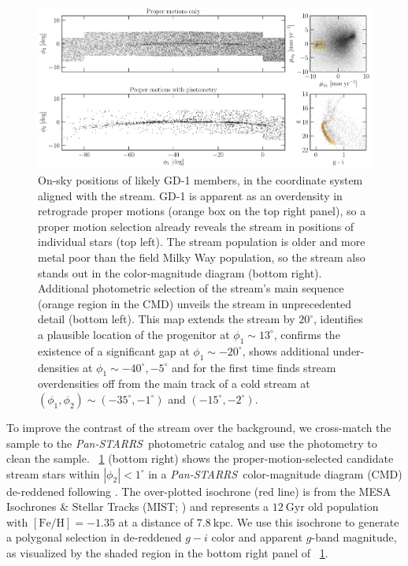 \documentclass[modern]{aastex62}
\newcommand{\pans}{\textsl{Pan-STARRS}}
\newcommand{\kpc}{\textrm{kpc}}
\newcommand{\feh}{\ensuremath{[\textrm{Fe} / \textrm{H}]}}
\begin{document}
\begin{figure}
\begin{center}
\includegraphics[width=\textwidth]{gd1_sample.pdf}
\end{center}
\caption{
On-sky positions of likely GD-1 members, in the coordinate system aligned with the stream.
GD-1 is apparent as an overdensity in retrograde proper motions (orange box on the top right panel), so a proper motion selection already reveals the stream in positions of individual stars (top left).
The stream population is older and more metal poor than the field Milky Way population, so the stream also stands out in the color-magnitude diagram (bottom right).
Additional photometric selection of the stream's main sequence (orange region in the CMD) unveils the stream in unprecedented detail (bottom left).
This map extends the stream by $20^\circ$, identifies a plausible location of the progenitor at $\phi_1\sim13^\circ$, confirms the existence of a significant gap at $\phi_1\sim-20^\circ$, shows additional under-densities at $\phi_1\sim-40^\circ,-5^\circ$ and for the first time finds stream overdensities off from the main track of a cold stream at $(\phi_1,\phi_2)\sim(-35^\circ,-1^\circ)$ and $(-15^\circ,-2^\circ)$.
}
\label{fig:selection}
\end{figure}

To improve the contrast of the stream over the background, we cross-match the
sample to the \pans\ photometric catalog and use the photometry to clean the
sample.
\figurename~\ref{fig:selection} (bottom right) shows the proper-motion-selected
candidate stream stars within $\left|\phi_2\right| < 1^\circ$ in a \pans\
color-magnitude diagram (CMD) de-reddened following \citet{Schlafly:2011}.
The over-plotted isochrone (red line) is from the MESA Isochrones \& Stellar
Tracks (MIST; \citealt{Dotter:2016, Choi:2016, Paxton:2011}) and represents a
$12~\textrm{Gyr}$ old population with $\feh = -1.35$ at a distance of
$7.8~\kpc$.
We use this isochrone to generate a polygonal selection in de-reddened $g-i$
color and apparent $g$-band magnitude, as visualized by the shaded region in the
bottom right panel of \figurename~\ref{fig:selection}.
\end{document}
